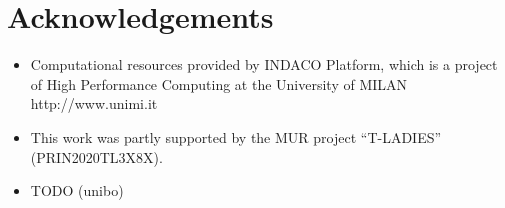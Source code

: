 \section*{Acknowledgements}
    
\begin{itemize}
    \item Computational resources provided by INDACO Platform, which is a project of High Performance Computing at the University of MILAN http://www.unimi.it
    \item This work was partly supported by the MUR project “T-LADIES” (PRIN2020TL3X8X).
    \item TODO (unibo)
\end{itemize}
